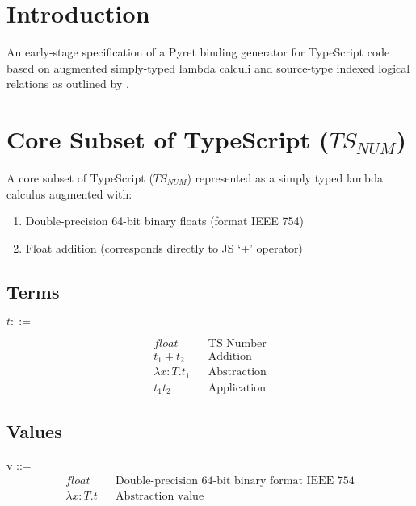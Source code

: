\documentclass{article}
\begin{document}
	
	\tableofcontents
	\pagebreak
	
	\section{Introduction}
	An early-stage specification of a Pyret binding generator for TypeScript code based on augmented simply-typed lambda calculi and source-type indexed logical relations as outlined by \textcite{FFI}.
	
	\section{Core Subset of TypeScript ($TS_{NUM}$)}
	
	A core subset of TypeScript ($TS_{NUM}$) represented as a simply typed lambda calculus augmented with:
	\begin{enumerate}
		\item Double-precision 64-bit binary floats (format IEEE 754)
		\item Float addition (corresponds directly to JS `+' operator)
	\end{enumerate}
	
	\subsection{Terms}
	$t ::=$
	
	\begin{align*}
		float  										&& \text{TS Number} \\
		t_1 + t_2 									&& \text{Addition} \\
		\lambda x\colon T.t_1						&& \text{Abstraction} \\
		t_1 t_2										&& \text{Application}
	\end{align*}


	\subsection{Values}
	v ::=
	\begin{align*}
		float										&& \text{Double-precision 64-bit binary format IEEE 754} \\
		\lambda x\colon T.t							&& \text{Abstraction value}
	\end{align*}
	
	
\end{document}
